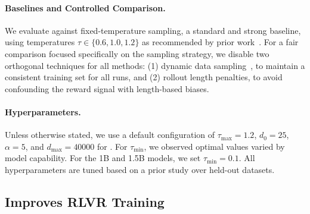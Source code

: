 \paragraph{Baselines and Controlled Comparison.}
We evaluate \alg against fixed-temperature sampling, a standard and strong baseline, using temperatures $\tau \in \{0.6, 1.0, 1.2\}$ as recommended by prior work~\citep{renze-2024-effect, guo2025deepseek, hou2025t1}. For a fair comparison focused specifically on the sampling strategy, we disable two orthogonal techniques for all methods: (1) dynamic data sampling~\citep{yu2025dapo}, to maintain a consistent training set for all runs, and (2) rollout length penalties, to avoid confounding the reward signal with length-based biases.

\paragraph{Hyperparameters.}
Unless otherwise stated, we use a default configuration of $\tau_{\max}=1.2$, $d_0=25$, $\alpha = 5$, and $d_{\max}=40000$ for \alg. 
%
For $\tau_{\min}$, we observed optimal values varied by model capability.
%
For the 1B and 1.5B models, we set $\tau_{\min}=0.1$. 
%
%
All hyperparameters are tuned based on a prior study over held-out datasets. 
%




\subsection{\alg Improves RLVR Training}

